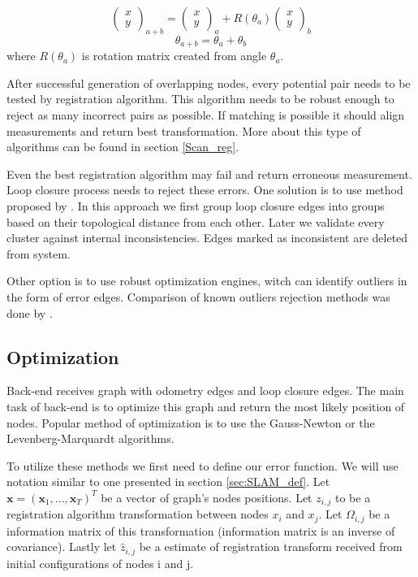 \begin{equation}
\begin{pmatrix}
x \\ y
\end{pmatrix}_{a+b}
=
\begin{pmatrix}
x \\ y
\end{pmatrix}_{a}
+ R(\theta_{a}) 
\begin{pmatrix}
x \\ y
\end{pmatrix}_{b}
\end{equation}
\begin{equation}
\theta_{a+b} = \theta_{a} + \theta_{b}
\end{equation}
where $R(\theta_{a})$ is rotation matrix created from angle $\theta_{a}$.

After successful generation of overlapping nodes, every potential pair needs to be tested by registration algorithm. This algorithm needs to be robust enough to reject as many incorrect pairs as possible. If matching is possible it should align measurements and return best transformation. More about this type of algorithms can be found in section \ref{Scan_reg}.

Even the best registration algorithm may fail and return erroneous measurement. Loop closure process needs to reject these errors. One solution is to use method proposed by \cite{Olson2009Loop}. In this approach we first group loop closure edges into groups based on their topological distance from each other. Later we validate every cluster against internal inconsistencies. Edges marked as inconsistent are deleted from system. 

Other option is to use robust optimization engines, witch can identify outliers in the form of error edges. Comparison of known outliers rejection methods was done by \cite{RobustOpt}. 



\subsection{Optimization}
Back-end receives graph with odometry edges and loop closure edges. The main task of back-end is to optimize this graph and return the most likely position of nodes. Popular method of optimization is to use the Gauss-Newton or the Levenberg-Marquardt algorithms. 

To utilize these methods we first need to define our error function. We will use notation similar to one presented in section \ref{sec:SLAM_def}. Let $\textbf{x} = (\textbf{x}_{1},...,\textbf{x}_{T})^{T} $ be a vector of graph's nodes positions. Let $z_{i,j}$ to be a registration algorithm transformation between nodes $x_{i}$ and $x_{j}$. Let $\Omega_{i,j}$ be a information matrix of this transformation (information matrix is an inverse of covariance). Lastly let $\hat{z}_{i,j}$ be a estimate of registration transform received from initial configurations of nodes i and j.

